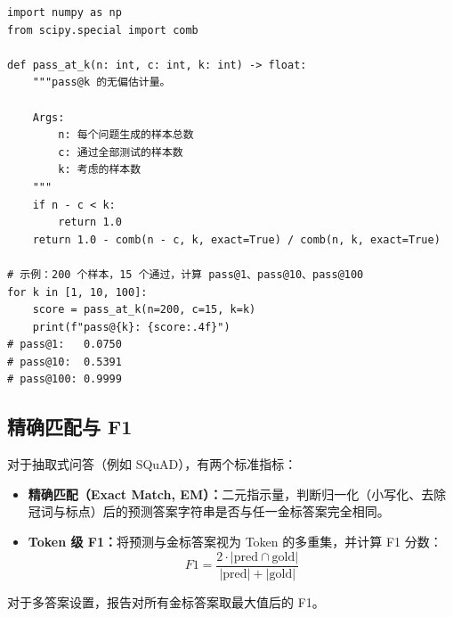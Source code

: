 \begin{examplebox}[Pass@k 计算]
\begin{lstlisting}[style=pythonstyle]
import numpy as np
from scipy.special import comb

def pass_at_k(n: int, c: int, k: int) -> float:
    """pass@k 的无偏估计量。

    Args:
        n: 每个问题生成的样本总数
        c: 通过全部测试的样本数
        k: 考虑的样本数
    """
    if n - c < k:
        return 1.0
    return 1.0 - comb(n - c, k, exact=True) / comb(n, k, exact=True)

# 示例：200 个样本，15 个通过，计算 pass@1、pass@10、pass@100
for k in [1, 10, 100]:
    score = pass_at_k(n=200, c=15, k=k)
    print(f"pass@{k}: {score:.4f}")
# pass@1:   0.0750
# pass@10:  0.5391
# pass@100: 0.9999
\end{lstlisting}
\end{examplebox}

\subsection{精确匹配与 F1}
\label{exact-match-and-f1}

对于抽取式问答（例如 SQuAD），有两个标准指标：

\begin{itemize}
  \item \textbf{精确匹配（Exact Match, EM）：}二元指示量，判断归一化（小写化、去除冠词与标点）后的预测答案字符串是否与任一金标答案完全相同。
  \item \textbf{Token 级 F1：}将预测与金标答案视为 Token 的多重集，并计算 F1 分数：
\begin{equation}
        F1 = \frac{2 \cdot |\text{pred} \cap \text{gold}|}{|\text{pred}| + |\text{gold}|}
\end{equation}
\end{itemize}

对于多答案设置，报告对所有金标答案取最大值后的 F1。

